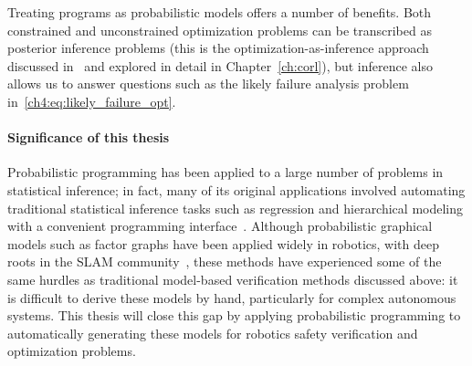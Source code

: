 Treating programs as probabilistic models offers a number of benefits. Both constrained and unconstrained optimization problems can be transcribed as posterior inference problems (this is the optimization-as-inference approach discussed in~\cite{maSamplingCanBe2019,levineReinforcementLearningControl2018a} and explored in detail in Chapter~\ref{ch:corl}), but inference also allows us to answer questions such as the likely failure analysis problem in~\eqref{ch4:eq:likely_failure_opt}.

\paragraph{Significance of this thesis} Probabilistic programming has been applied to a large number of problems in statistical inference; in fact, many of its original applications involved automating traditional statistical inference tasks such as regression and hierarchical modeling with a convenient programming interface~\cite{cusumano-townerGenGeneralpurposeProbabilistic2019}. Although probabilistic graphical models such as factor graphs have been applied widely in robotics, with deep roots in the SLAM community~\cite{dellaertFactorGraphsExploiting2021}, these methods have experienced some of the same hurdles as traditional model-based verification methods discussed above: it is difficult to derive these models by hand, particularly for complex autonomous systems. This thesis will close this gap by applying probabilistic programming to automatically generating these models for robotics safety verification and optimization problems.
